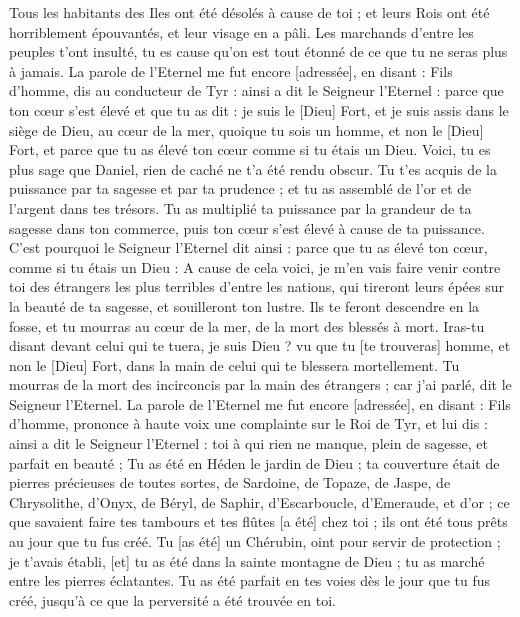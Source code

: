 \begin{multicols}{2}
Tous les habitants des Iles ont été désolés à cause de toi ; et leurs Rois ont été horriblement épouvantés, et leur visage en a pâli.
Les marchands d'entre les peuples t'ont insulté, tu es cause qu'on est tout étonné de ce que tu ne seras plus à jamais.
\VerseOne{}La parole de l'Eternel me fut encore [adressée], en disant :
Fils d'homme, dis au conducteur de Tyr : ainsi a dit le Seigneur l'Eternel : parce que ton cœur s'est élevé et que tu as dit : je suis le [Dieu] Fort, et je suis assis dans le siège de Dieu, au cœur de la mer, quoique tu sois un homme, et non le [Dieu] Fort, et parce que tu as élevé ton cœur comme si tu étais un Dieu.
Voici, tu es plus sage que Daniel, rien de caché ne t'a été rendu obscur.
Tu t'es acquis de la puissance par ta sagesse et par ta prudence ; et tu as assemblé de l'or et de l'argent dans tes trésors.
Tu as multiplié ta puissance par la grandeur de ta sagesse dans ton commerce, puis ton cœur s'est élevé à cause de ta puissance.
C'est pourquoi le Seigneur l'Eternel dit ainsi : parce que tu as élevé ton cœur, comme si tu étais un Dieu :
A cause de cela voici, je m'en vais faire venir contre toi des étrangers les plus terribles d'entre les nations, qui tireront leurs épées sur la beauté de ta sagesse, et souilleront ton lustre.
Ils te feront descendre en la fosse, et tu mourras au cœur de la mer, de la mort des blessés à mort.
Iras-tu disant devant celui qui te tuera, je suis Dieu ? vu que tu [te trouveras] homme, et non le [Dieu] Fort, dans la main de celui qui te blessera mortellement.
Tu mourras de la mort des incirconcis par la main des étrangers ; car j'ai parlé, dit le Seigneur l'Eternel.
La parole de l'Eternel me fut encore [adressée], en disant :
Fils d'homme, prononce à haute voix une complainte sur le Roi de Tyr, et lui dis : ainsi a dit le Seigneur l'Eternel : toi à qui rien ne manque, plein de sagesse, et parfait en beauté ;
Tu as été en Héden le jardin de Dieu ; ta couverture était de pierres précieuses de toutes sortes, de Sardoine, de Topaze, de Jaspe, de Chrysolithe, d'Onyx, de Béryl, de Saphir, d'Escarboucle, d'Emeraude, et d'or ; ce que savaient faire tes tambours et tes flûtes [a été] chez toi ; ils ont été tous prêts au jour que tu fus créé.
Tu [as été] un Chérubin, oint pour servir de protection ; je t'avais établi, [et] tu as été dans la sainte montagne de Dieu ; tu as marché entre les pierres éclatantes.
Tu as été parfait en tes voies dès le jour que tu fus créé, jusqu'à ce que la perversité a été trouvée en toi.

\end{multicols}
